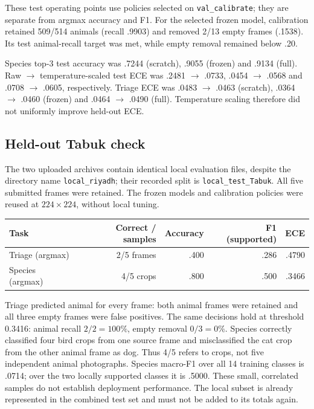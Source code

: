 \documentclass[11pt,a4paper]{article}
\begin{document}
These test operating points use policies selected on \texttt{val\_calibrate}; they are separate from argmax accuracy and F1. For the selected frozen model, calibration retained 509/514 animals (recall .9903) and removed 2/13 empty frames (.1538). Its test animal-recall target was met, while empty removal remained below .20.

Species top-3 test accuracy was .7244 (scratch), .9055 (frozen) and .9134 (full). Raw $\rightarrow$ temperature-scaled test ECE was .2481 $\rightarrow$ .0733, .0454 $\rightarrow$ .0568 and .0708 $\rightarrow$ .0605, respectively. Triage ECE was .0483 $\rightarrow$ .0463 (scratch), .0364 $\rightarrow$ .0460 (frozen) and .0464 $\rightarrow$ .0490 (full). Temperature scaling therefore did not uniformly improve held-out ECE.

\subsection{Held-out Tabuk check}
The two uploaded archives contain identical local evaluation files, despite the directory name \texttt{local\_riyadh}; their recorded split is \texttt{local\_test\_Tabuk}. All five submitted frames were retained. The frozen models and calibration policies were reused at $224\times224$, without local tuning.

\begin{tabularx}{\linewidth}{@{}Y r r r r@{}}
\toprule
Task & Correct / samples & Accuracy & F1 (supported) & ECE \\
\midrule
Triage (argmax) & 2/5 frames & .400 & .286 & .4790 \\
Species (argmax) & 4/5 crops & .800 & .500 & .3466 \\
\bottomrule
\end{tabularx}

Triage predicted animal for every frame: both animal frames were retained and all three empty frames were false positives. The same decisions hold at threshold 0.3416: animal recall $2/2=100\%$, empty removal $0/3=0\%$. Species correctly classified four bird crops from one source frame and misclassified the cat crop from the other animal frame as dog. Thus 4/5 refers to crops, not five independent animal photographs. Species macro-F1 over all 14 training classes is .0714; over the two locally supported classes it is .5000. These small, correlated samples do not establish deployment performance. The local subset is already represented in the combined test set and must not be added to its totals again.
\end{document}

